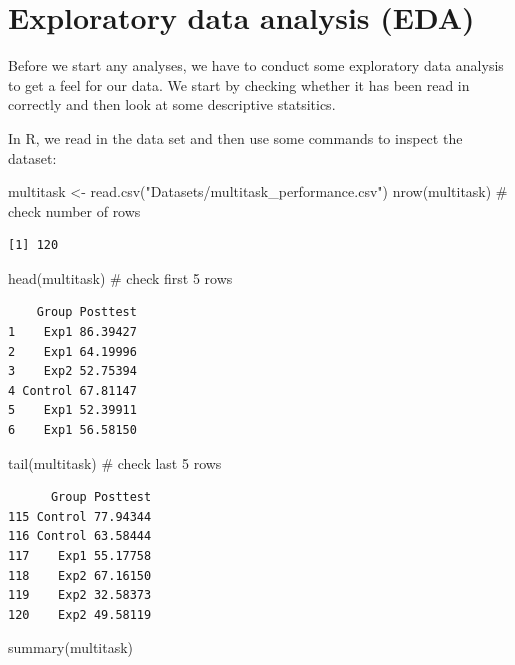 \documentclass[
  letterpaper,
  DIV=11,
  numbers=noendperiod,
  oneside]{scrreprt}
\newenvironment{Shaded}{\begin{snugshade}}{\end{snugshade}}
\newcommand{\CommentTok}[1]{\textcolor[rgb]{0.37,0.37,0.37}{#1}}
\newcommand{\FunctionTok}[1]{\textcolor[rgb]{0.28,0.35,0.67}{#1}}
\newcommand{\NormalTok}[1]{\textcolor[rgb]{0.00,0.23,0.31}{#1}}
\newcommand{\OtherTok}[1]{\textcolor[rgb]{0.00,0.23,0.31}{#1}}
\newcommand{\StringTok}[1]{\textcolor[rgb]{0.13,0.47,0.30}{#1}}
\begin{document}
\section{Exploratory data analysis
(EDA)}\label{exploratory-data-analysis-eda}

Before we start any analyses, we have to conduct some exploratory data
analysis to get a feel for our data. We start by checking whether it has
been read in correctly and then look at some descriptive statsitics.

In R, we read in the data set and then use some commands to inspect the
dataset:

\begin{Shaded}
\begin{Highlighting}[]
\NormalTok{multitask }\OtherTok{\textless{}{-}} \FunctionTok{read.csv}\NormalTok{(}\StringTok{"Datasets/multitask\_performance.csv"}\NormalTok{)}
\FunctionTok{nrow}\NormalTok{(multitask) }\CommentTok{\# check number of rows}
\end{Highlighting}
\end{Shaded}

\begin{verbatim}
[1] 120
\end{verbatim}

\begin{Shaded}
\begin{Highlighting}[]
\FunctionTok{head}\NormalTok{(multitask) }\CommentTok{\# check first 5 rows }
\end{Highlighting}
\end{Shaded}

\begin{verbatim}
    Group Posttest
1    Exp1 86.39427
2    Exp1 64.19996
3    Exp2 52.75394
4 Control 67.81147
5    Exp1 52.39911
6    Exp1 56.58150
\end{verbatim}

\begin{Shaded}
\begin{Highlighting}[]
\FunctionTok{tail}\NormalTok{(multitask) }\CommentTok{\# check last 5 rows }
\end{Highlighting}
\end{Shaded}

\begin{verbatim}
      Group Posttest
115 Control 77.94344
116 Control 63.58444
117    Exp1 55.17758
118    Exp2 67.16150
119    Exp2 32.58373
120    Exp2 49.58119
\end{verbatim}

\begin{Shaded}
\begin{Highlighting}[]
\FunctionTok{summary}\NormalTok{(multitask)}
\end{Highlighting}
\end{Shaded}
\end{document}
